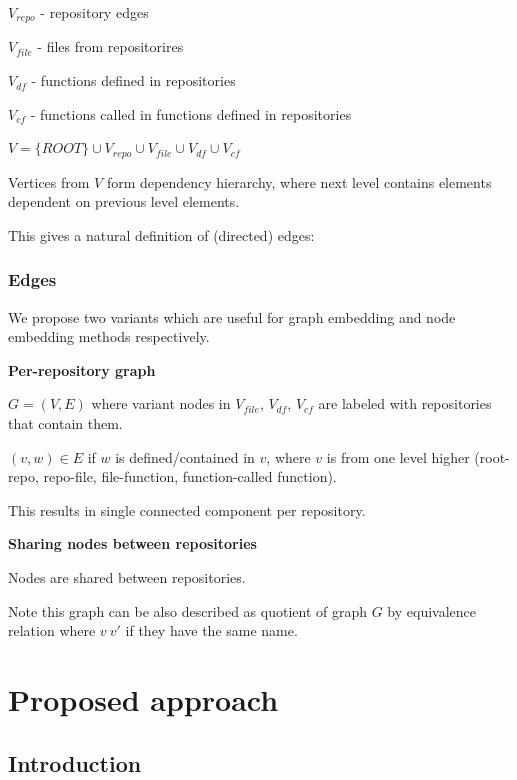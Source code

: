\documentclass[11pt]{report}
\begin{document}
\(V_{repo}\) - repository edges



\(V_{file}\) - files from repositorires 



\(V_{df}\) - functions defined in repositories



\(V_{cf}\) - functions called in functions defined in repositories



\(V = \{ROOT\} \cup V_{repo} \cup V_{file} \cup V_{df} \cup V_{cf}\)



Vertices from \(V\) form dependency hierarchy, where next level contains elements dependent on previous level elements.

This gives a natural definition of (directed) edges:


\subsection{Edges}

We propose two variants which are useful for graph embedding and node embedding methods respectively.

\textbf{Per-repository graph}

$G = (V, E)$ where variant nodes in $V_{file}$, $V_{df}$, $V_{cf}$ are labeled with repositories that contain them.

\((v, w) \in E\) if \(w\) is defined/contained in \(v\), where \(v\) is from one level higher (root-repo, repo-file, file-function, function-called function).

This results in single connected component per repository.

\textbf{Sharing nodes between repositories}

Nodes are shared between repositories.

Note this graph can be also described as quotient of graph $G$ by equivalence relation where $v ~ v'$ if they have the same name.

\chapter{Proposed approach}

\section{Introduction}
\end{document}
